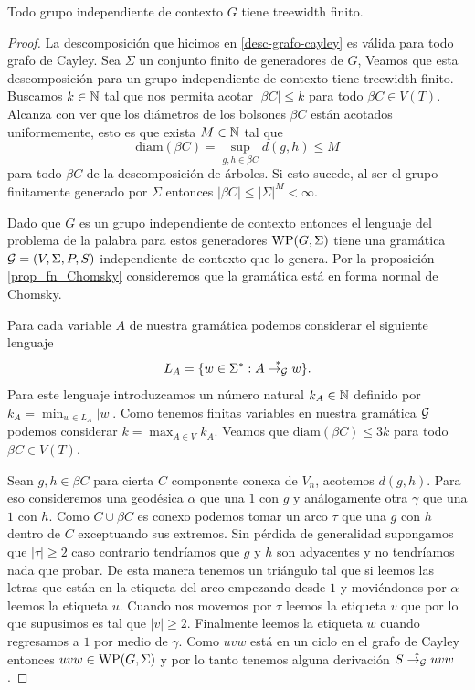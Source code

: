 \documentclass[tesis.tex]{subfiles}
\begin{document}
\begin{teo} \label{teo_Mul-Sch}\cite{muller1985theory}
	Todo grupo independiente de contexto $G$ tiene treewidth finito.
\end{teo}
\begin{proof}
	La descomposición que hicimos en \ref{desc-grafo-cayley} es válida para todo grafo de Cayley.
	Sea $\Sigma$ un conjunto finito de generadores de $G$, 
	Veamos que esta descomposición para un grupo independiente de contexto tiene treewidth finito. 
	Buscamos $k \in \mathbb{N}$ tal que nos permita acotar $|\beta C| \le k$ para todo $\beta C \in V(T)$. 
	Alcanza con ver que los diámetros de los bolsones $\beta C$ están acotados uniformemente, 
	esto es que exista $M \in \mathbb{N}$ tal que 
	\[
	\text{diam}(\beta C) =  \sup_{g,h \in \beta C} d(g,h) \le M
	\] 
	para todo $\beta C$ de la descomposición de árboles.
	Si esto sucede, al ser el grupo finitamente generado por $\Sigma$ entonces $|\beta C| \le |\Sigma|^{M} < \infty$.
	
	
	Dado que $G$ es un grupo independiente de contexto entonces el lenguaje del problema de la palabra para estos generadores $\text{WP}(G, \Sigma)$ tiene una gramática $ {\cal G} = (V, \Sigma, P, S)$ independiente de contexto que lo genera. 
	Por la proposición \ref{prop_fn_Chomsky} consideremos que la gramática está en forma normal de Chomsky.
	
	Para cada variable $A$ de nuestra gramática podemos considerar el siguiente lenguaje
	\[
	L_A = \{ w \in \Sigma^* : A \overset{*}{\to_{\cal G}} w  \}.
	\]
	Para este lenguaje introduzcamos un número natural $k_A \in \mathbb{N}$ definido por $k_A = {\min}_{w \in L_A} |w|$. 
	Como tenemos finitas variables en nuestra gramática $\cal G$ podemos considerar $k = \max_{A \in V} k_A$. 
	Veamos que $\text{diam}(\beta C) \le 3k$ para todo $\beta C \in V(T)$.
	
	Sean $g,h \in \beta C$ para cierta $C$ componente conexa de $V_n$, acotemos $d(g,h)$. 
	Para eso consideremos una geodésica $\alpha$ que una $1$ con $g$ y análogamente otra $\gamma$ que una $1$ con $h$. 
	Como $C \cup \beta C$ es conexo podemos tomar un arco $\tau$ que una $g$ con  $h$ dentro de $C$ exceptuando sus extremos. 
	Sin pérdida de generalidad supongamos que $|\tau| \ge 2$ caso contrario tendríamos que $g$ y $h$ son adyacentes y no tendríamos nada que probar.
	De esta manera tenemos un triángulo tal que si leemos las letras que están en la etiqueta del arco empezando desde $1$ y moviéndonos por $\alpha$ leemos la etiqueta $u$. 
	Cuando nos movemos por $\tau$ leemos la etiqueta $v$ que por lo que supusimos es tal que $|v| \ge 2$. 
	Finalmente leemos la etiqueta $w$ cuando regresamos a $1$ por medio de $\gamma$.
	Como $uvw$ está en un ciclo en el grafo de Cayley entonces $uvw \in  \text{WP}(G, \Sigma)$ y por lo tanto tenemos alguna derivación $S \overset{*}{\to_{\cal G}} uvw$.
	

\end{proof}
\end{document}
